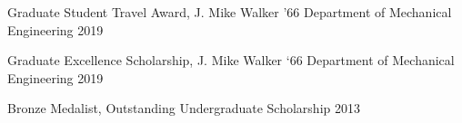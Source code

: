 



\begin{cvhonors}

  \cvhonor
    {Graduate Student Travel Award,} %
    {J. Mike Walker ’66 Department of Mechanical Engineering} %
    {} %
    {2019} %

  \cvhonor
    {Graduate Excellence Scholarship,} %
    {J. Mike Walker `66 Department of Mechanical Engineering } %
    {} %
    {2019} %

  \cvhonor
    {Bronze Medalist,} %
    {Outstanding Undergraduate Scholarship} %
    {} %
    {2013} %

\end{cvhonors}



